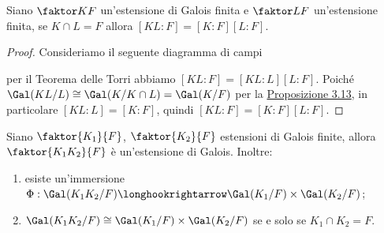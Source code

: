 \documentclass[11pt]{scrartcl}
\begin{document}
\begin{corollary}
    Siano $\faktor K F$ un'estensione di Galois finita e $\faktor L F$ un'estensione finita, se $K\cap L = F$ allora $[KL:F] = [K:F][L:F]$.
\end{corollary}

\begin{proof}
    Consideriamo il seguente diagramma di campi
    \begin{center}
    \end{center}
    per il Teorema delle Torri abbiamo $[KL:F] = [KL:L][L:F]$. Poiché 
    $\Gal(KL/L) \cong \Gal(K/K\cap L) = \Gal(K/F)$ per la 
    \hyperref[prop3.13]{Proposizione 3.13}, in particolare $[KL:L] = [K:F]$,
    quindi $[KL:F] = [K:F][L:F]$.
\end{proof}

\begin{proposition}
    \label{prop3.15}
    Siano $\faktor{K_1}{F}$, $\faktor{K_2}{F}$ estensioni di Galois finite, 
    allora $\faktor{K_1K_2}{F}$ è un'estensione di Galois. Inoltre:
    \begin{enumerate}[(1)]
        \item esiste un'immersione $\Phi: \Gal(K_1K_2/F) \longhookrightarrow 
        \Gal(K_1/F)\times\Gal(K_2/F)$;
        \item $\Gal(K_1K_2/F)\cong \Gal(K_1/F)\times\Gal(K_2/F)$ se e solo 
        se $K_1\cap K_2 = F$. 
    \end{enumerate}
\end{proposition}
\end{document}
